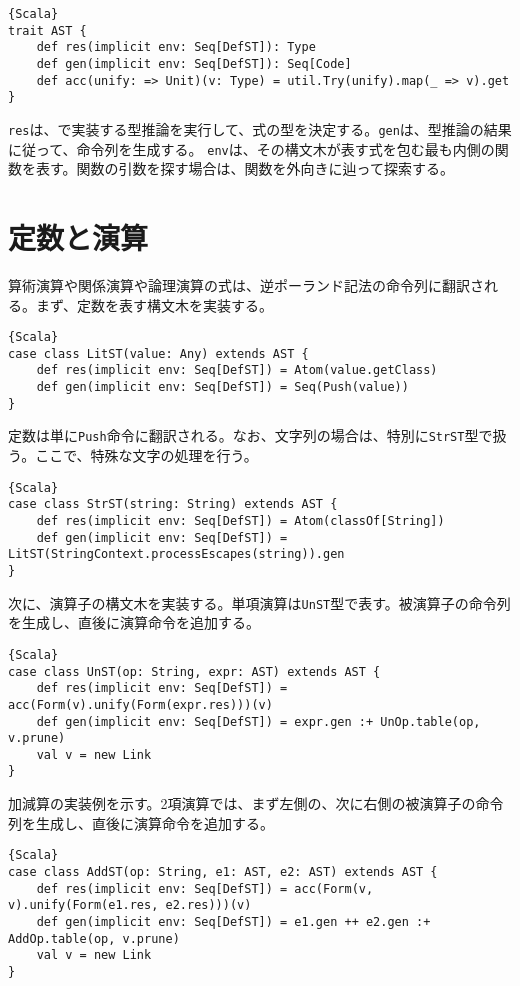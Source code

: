 \documentclass[10pt,a4paper]{book}
\begin{document}
\begin{Verbatim}{Scala}
trait AST {
	def res(implicit env: Seq[DefST]): Type
	def gen(implicit env: Seq[DefST]): Seq[Code]
	def acc(unify: => Unit)(v: Type) = util.Try(unify).map(_ => v).get
}
\end{Verbatim}

\texttt{res}は、で実装する型推論を実行して、式の型を決定する。\texttt{gen}は、型推論の結果に従って、命令列を生成する。
\texttt{env}は、その構文木が表す式を包む最も内側の関数を表す。関数の引数を探す場合は、関数を外向きに辿って探索する。

\section{定数と演算\label{sect:OpST}}

算術演算や関係演算や論理演算の式は、逆ポーランド記法の命令列に翻訳される。まず、定数を表す構文木を実装する。

\begin{Verbatim}{Scala}
case class LitST(value: Any) extends AST {
	def res(implicit env: Seq[DefST]) = Atom(value.getClass)
	def gen(implicit env: Seq[DefST]) = Seq(Push(value))
}
\end{Verbatim}

定数は単に\texttt{Push}命令に翻訳される。なお、文字列の場合は、特別に\texttt{StrST}型で扱う。ここで、特殊な文字の処理を行う。

\begin{Verbatim}{Scala}
case class StrST(string: String) extends AST {
	def res(implicit env: Seq[DefST]) = Atom(classOf[String])
	def gen(implicit env: Seq[DefST]) = LitST(StringContext.processEscapes(string)).gen
}
\end{Verbatim}

次に、演算子の構文木を実装する。単項演算は\texttt{UnST}型で表す。被演算子の命令列を生成し、直後に演算命令を追加する。

\begin{Verbatim}{Scala}
case class UnST(op: String, expr: AST) extends AST {
	def res(implicit env: Seq[DefST]) = acc(Form(v).unify(Form(expr.res)))(v)
	def gen(implicit env: Seq[DefST]) = expr.gen :+ UnOp.table(op, v.prune)
	val v = new Link
}
\end{Verbatim}

加減算の実装例を示す。2項演算では、まず左側の、次に右側の被演算子の命令列を生成し、直後に演算命令を追加する。

\begin{Verbatim}{Scala}
case class AddST(op: String, e1: AST, e2: AST) extends AST {
	def res(implicit env: Seq[DefST]) = acc(Form(v, v).unify(Form(e1.res, e2.res)))(v)
	def gen(implicit env: Seq[DefST]) = e1.gen ++ e2.gen :+ AddOp.table(op, v.prune)
	val v = new Link
}
\end{Verbatim}
\end{document}
